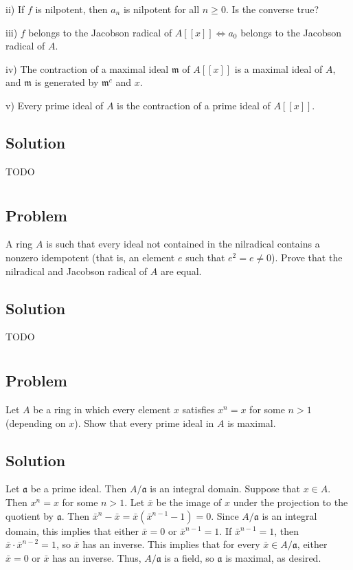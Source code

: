 \documentclass[book,12pt,oneside,openany]{memoir}
\begin{document}
ii) If $f$ is nilpotent, then $a_n$ is nilpotent for all $n \geq 0$. Is the converse true?

iii) $f$ belongs to the Jacobson radical of $A[[x]] \Leftrightarrow a_0$ belongs to the Jacobson radical of $A$.

iv) The contraction of a maximal ideal $\mathfrak{m}$ of $A[[x]]$ is a maximal ideal of $A$, and $\mathfrak{m}$ is generated by $\mathfrak{m}^c$ and $x$.

v) Every prime ideal of $A$ is the contraction of a prime ideal of $A[[x]]$.


\subsection{Solution}
TODO
\section{}
\subsection{Problem}
A ring $A$ is such that every ideal not contained in the nilradical contains a nonzero idempotent (that is, an element $e$ such that $e^2 = e \neq 0$). Prove that the nilradical and Jacobson radical of $A$ are equal.
\subsection{Solution}
TODO


\section{}
\subsection{Problem}
Let $A$ be a ring in which every element $x$ satisfies $x^n = x$ for some $n > 1$ (depending on $x$). Show that every prime ideal in $A$ is maximal.
\subsection{Solution}
Let $\mathfrak{a}$ be a prime ideal. Then $A/\mathfrak{a}$ is an integral domain. Suppose that $x \in A$. Then $x^n = x$ for some $n > 1$. Let $\bar{x}$ be the image of $x$ under the projection to the quotient by $\mathfrak{a}$. Then $\bar{x}^n - \bar{x} = \bar{x} (\bar{x}^{n-1} - 1) = 0$. Since $A/\mathfrak{a}$ is an integral domain, this implies that either $\bar{x} = 0$ or $\bar{x}^{n-1} = 1$. If $\bar{x}^{n-1} = 1$, then $\bar{x} \cdot \bar{x}^{n-2} = 1$, so $\bar{x}$ has an inverse. This implies that for every $\bar{x} \in A/\mathfrak{a}$, either $\bar{x} = 0$ or $\bar{x}$ has an inverse. Thus, $A/\mathfrak{a}$ is a field, so $\mathfrak{a}$ is maximal, as desired.
\end{document}
